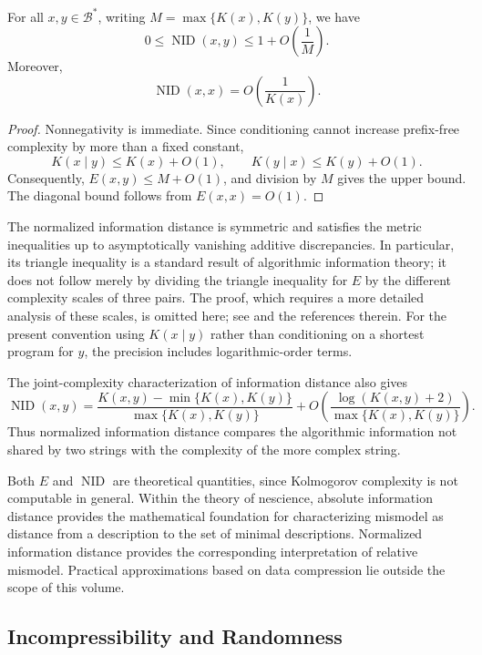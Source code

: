 \begin{proposition}
\label{prop:normalized-information-distance-bounds}
For all $x,y\in\mathcal{B}^*$, writing $M=\max\{K(x),K(y)\}$, we have
\[
0\leq\operatorname{NID}(x,y)\leq 1+O\!\left(\frac{1}{M}\right).
\]
Moreover,
\[
\operatorname{NID}(x,x)=O\!\left(\frac{1}{K(x)}\right).
\]
\end{proposition}
\begin{proof}
Nonnegativity is immediate. Since conditioning cannot increase prefix-free complexity by more than a fixed constant,
\[
K(x\mid y)\leq K(x)+O(1), \qquad K(y\mid x)\leq K(y)+O(1).
\]
Consequently, $E(x,y)\leq M+O(1)$, and division by $M$ gives the upper bound. The diagonal bound follows from $E(x,x)=O(1)$.
\end{proof}

The normalized information distance is symmetric and satisfies the metric inequalities up to asymptotically vanishing additive discrepancies. In particular, its triangle inequality is a standard result of algorithmic information theory; it does not follow merely by dividing the triangle inequality for $E$ by the different complexity scales of three pairs. The proof, which requires a more detailed analysis of these scales, is omitted here; see \cite{LV13} and the references therein. For the present convention using $K(x\mid y)$ rather than conditioning on a shortest program for $y$, the precision includes logarithmic-order terms.

The joint-complexity characterization of information distance also gives
\[
\operatorname{NID}(x,y)=
\frac{K(x,y)-\min\{K(x),K(y)\}}
     {\max\{K(x),K(y)\}}
+O\!\left(
\frac{\log(K(x,y)+2)}{\max\{K(x),K(y)\}}
\right).
\]
Thus normalized information distance compares the algorithmic information not shared by two strings with the complexity of the more complex string.

Both $E$ and $\operatorname{NID}$ are theoretical quantities, since Kolmogorov complexity is not computable in general. Within the theory of nescience, absolute information distance provides the mathematical foundation for characterizing mismodel as distance from a description to the set of minimal descriptions. Normalized information distance provides the corresponding interpretation of relative mismodel. Practical approximations based on data compression lie outside the scope of this volume.


\subsection*{Incompressibility and Randomness}
\label{sec:incompressibility_randomness}

